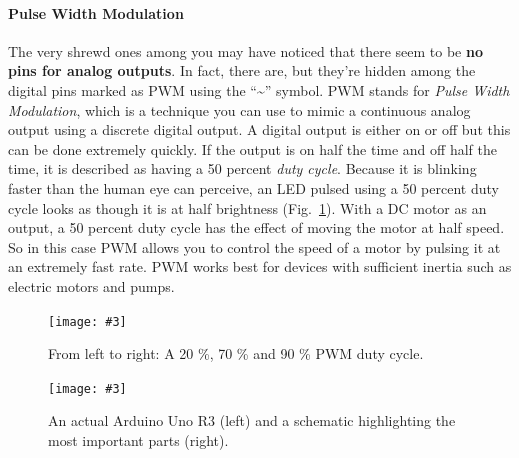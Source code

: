 \documentclass[10pt,twoside,openright]{article}
\newcommand{\mijnfiguur}[5][ht]{            %
    \begin{figure}[#1]                      %
        \begin{center}                      %
            \texttt{[image: \#3]}        %
        \end{center}
        \caption{#4\label{#5}}          %
    \end{figure}
    }
\begin{document}
\paragraph{Pulse Width Modulation}
The very shrewd ones among you may have noticed that there seem to be \textbf{no pins for analog outputs}. In fact, there are, but they’re hidden among the digital pins marked as PWM using the “\textasciitilde” symbol. PWM stands for \textit{Pulse Width Modulation}, which is a technique you can use to mimic a continuous analog output using a discrete digital output. A digital output is either on or off but this can be done extremely quickly. If the output is on half the time and off half the time, it is described as having a 50 percent \textit{duty cycle}. Because it is blinking faster than the human eye can perceive, an LED pulsed using a 50 percent duty cycle looks as though it is at half brightness (Fig.~\ref{fig:PWM}). With a DC motor as an output, a 50 percent duty cycle has the effect of moving the motor at half speed. So in this case PWM allows you to control the speed of a motor by pulsing it at an extremely fast rate. PWM works best for devices with sufficient inertia such as electric motors and pumps.

\mijnfiguur[h!]{width=\textwidth}{PWM.pdf}{From left to right: A 20 \%, 70 \% and 90 \% PWM duty cycle.}{fig:PWM}

\mijnfiguur[h!]{width=16cm}{ARDUINO_UNO.png}{An actual Arduino Uno R3 (left) and a schematic highlighting the most important parts (right).}{fig:ARDUINO_UNO}


\end{document}

